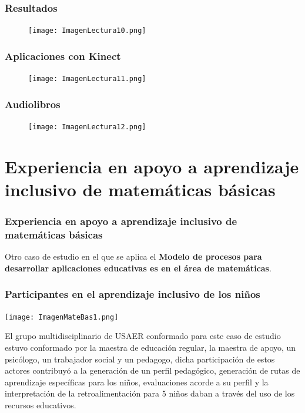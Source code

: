 \documentclass[11pt]{beamer}
\begin{document}
\begin{frame}
\frametitle{Resultados}
    \begin{figure}
    \centering
     \texttt{[image: ImagenLectura10.png]}
    \end{figure}
\end{frame}

\begin{frame}
\frametitle{Aplicaciones con Kinect}
    \begin{figure}
    \centering
     \texttt{[image: ImagenLectura11.png]}
    \end{figure}
\end{frame}

\begin{frame}
\frametitle{Audiolibros}
    \begin{figure}
    \centering
     \texttt{[image: ImagenLectura12.png]}
    \end{figure}
\end{frame}

\section{Experiencia en apoyo a aprendizaje inclusivo de matemáticas básicas}
\begin{frame}
\frametitle{Experiencia en apoyo a aprendizaje inclusivo de matemáticas básicas}
\justify
    Otro caso de estudio en el que se aplica el {\bf Modelo de procesos para desarrollar aplicaciones educativas es en el área de matemáticas}.
\end{frame}

\begin{frame}
\frametitle{Participantes en el aprendizaje inclusivo de los niños}
    \justify
    \begin{minipage}[c]{0.4\textwidth} 
    \texttt{[image: ImagenMateBas1.png]} 
    \end{minipage}
    \begin{minipage}[c]{0.55\textwidth}
        El grupo multidisciplinario de USAER conformado para este caso de estudio estuvo conformado por la maestra de educación regular, la maestra de apoyo, un psicólogo, un trabajador social y un pedagogo, dicha participación de estos actores contribuyó a la generación de un perfil pedagógico, generación de rutas de aprendizaje específicas para los niños, evaluaciones acorde a su  perfil y la interpretación de la retroalimentación para 5 niños daban a través del uso de los recursos educativos.
    \end{minipage}
\end{frame}
\end{document}
